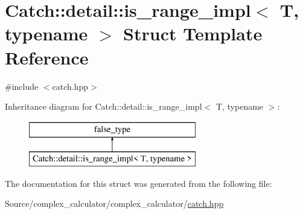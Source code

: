 \hypertarget{struct_catch_1_1detail_1_1is__range__impl}{}\section{Catch\+:\+:detail\+:\+:is\+\_\+range\+\_\+impl$<$ T, typename $>$ Struct Template Reference}
\label{struct_catch_1_1detail_1_1is__range__impl}


{\ttfamily \#include $<$catch.\+hpp$>$}

Inheritance diagram for Catch\+:\+:detail\+:\+:is\+\_\+range\+\_\+impl$<$ T, typename $>$\+:\begin{figure}[H]
\begin{center}
\leavevmode
\includegraphics[height=2.000000cm]{struct_catch_1_1detail_1_1is__range__impl}
\end{center}
\end{figure}


The documentation for this struct was generated from the following file\+:\begin{DoxyCompactItemize}
\item 
Source/complex\+\_\+calculator/complex\+\_\+calculator/\mbox{\hyperlink{catch_8hpp}{catch.\+hpp}}\end{DoxyCompactItemize}
